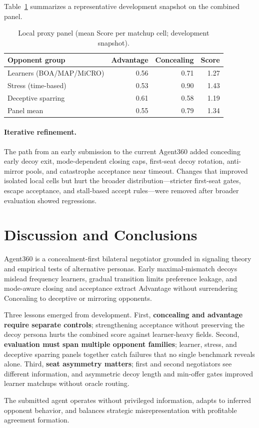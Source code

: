 \documentclass[11pt]{article}
\begin{document}
Table~\ref{tab:local} summarizes a representative development snapshot on the combined panel.

\begin{table}[ht]
  \centering
  \caption{Local proxy panel (mean Score per matchup cell; development snapshot).}
  \label{tab:local}
  \begin{tabular}{@{}lrrr@{}}
    \toprule
    Opponent group & Advantage & Concealing & Score \\
    \midrule
    Learners (BOA/MAP/MiCRO) & 0.56 & 0.71 & 1.27 \\
    Stress (time-based)      & 0.53 & 0.90 & 1.43 \\
    Deceptive sparring       & 0.61 & 0.58 & 1.19 \\
    \midrule
    Panel mean               & 0.55 & 0.79 & 1.34 \\
    \bottomrule
  \end{tabular}
\end{table}

\paragraph{Iterative refinement.}
The path from an early submission to the current Agent360 added conceding early decoy exit,
mode-dependent closing caps, first-seat decoy rotation, anti-mirror pools, and catastrophe
acceptance near timeout.
Changes that improved isolated local cells but hurt the broader distribution---stricter
first-seat gates, escape acceptance, and stall-based accept rules---were removed after broader
evaluation showed regressions.

\section{Discussion and Conclusions}

Agent360 is a concealment-first bilateral negotiator grounded in signaling theory and empirical
tests of alternative personas.
Early maximal-mismatch decoys mislead frequency learners, gradual transition limits preference
leakage, and mode-aware closing and acceptance extract Advantage without surrendering Concealing
to deceptive or mirroring opponents.

Three lessons emerged from development.
First, \textbf{concealing and advantage require separate controls}; strengthening acceptance
without preserving the decoy persona hurts the combined score against learner-heavy fields.
Second, \textbf{evaluation must span multiple opponent families}; learner, stress, and deceptive
sparring panels together catch failures that no single benchmark reveals alone.
Third, \textbf{seat asymmetry matters}; first and second negotiators see different information,
and asymmetric decoy length and min-offer gates improved learner matchups without oracle routing.

The submitted agent operates without privileged information, adapts to inferred opponent behavior,
and balances strategic misrepresentation with profitable agreement formation.
\end{document}
